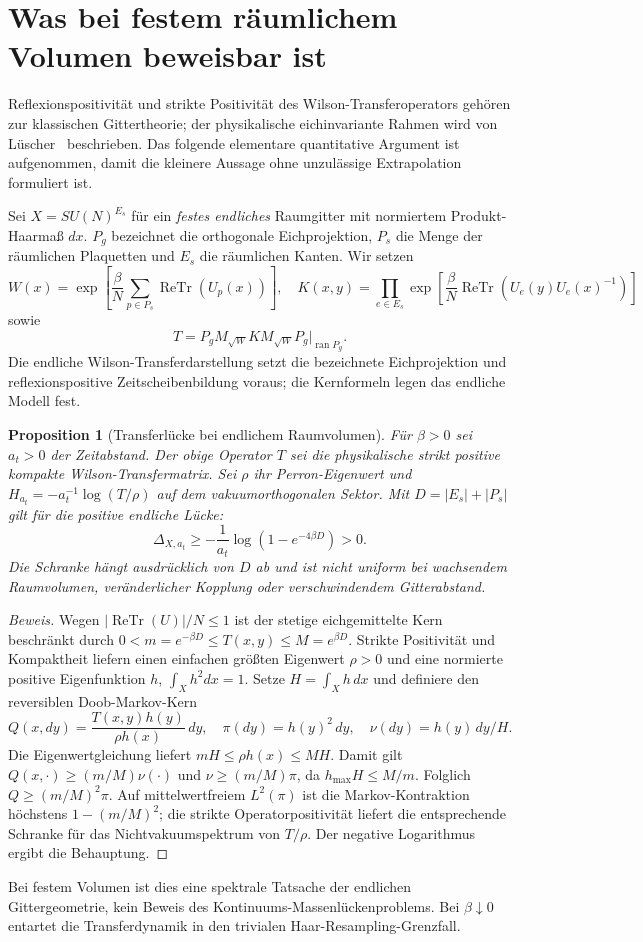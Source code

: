 \documentclass[11pt,a4paper]{article}
\newtheorem{proposition}[theorem]{Proposition}
\theoremstyle{remark}
\begin{document}
\section{Was bei festem räumlichem Volumen beweisbar ist}
Reflexionspositivität und strikte Positivität
des Wilson-Transferoperators gehören zur
klassischen Gittertheorie; der physikalische
eichinvariante Rahmen wird von
Lüscher~\cite{Luscher} beschrieben.
Das folgende elementare quantitative Argument
ist aufgenommen, damit die kleinere Aussage
ohne unzulässige Extrapolation formuliert ist.

Sei $X=SU(N)^{E_s}$ für ein \emph{festes endliches}
Raumgitter mit normiertem Produkt-Haarmaß $dx$.
$P_g$ bezeichnet die orthogonale Eichprojektion,
$P_s$ die Menge der räumlichen Plaquetten und
$E_s$ die räumlichen Kanten. Wir setzen
\[
W(x)=\exp\left[\frac\beta N\sum_{p\in P_s}
\operatorname{ReTr}(U_p(x))\right],
\quad
K(x,y)=\prod_{e\in E_s}
\exp\left[\frac\beta N\operatorname{ReTr}
(U_e(y)U_e(x)^{-1})\right]
\]
sowie
\[
T=P_g M_{\sqrt W}K M_{\sqrt W}P_g
       \big|_{\operatorname{ran}P_g}.
\]
Die endliche Wilson-Transferdarstellung setzt
die bezeichnete Eichprojektion und
reflexionspositive Zeitscheibenbildung voraus;
die Kernformeln legen das endliche Modell fest.

\begin{proposition}[Transferlücke bei endlichem Raumvolumen]\label{prop:finite}
Für $\beta>0$ sei $a_t>0$ der Zeitabstand.
Der obige Operator $T$ sei die physikalische
strikt positive kompakte Wilson-Transfermatrix.
Sei $\rho$ ihr Perron-Eigenwert und
$H_{a_t}=-a_t^{-1}\log(T/\rho)$ auf dem
vakuumorthogonalen Sektor.
Mit $D=|E_s|+|P_s|$ gilt für die
positive endliche Lücke:
\[
\boxed{\ \Delta_{X,a_t}\ge
-\frac{1}{a_t}\log\!\left(1-e^{-4\beta D}\right)>0.\ }
\]
Die Schranke hängt ausdrücklich von $D$ ab und
ist \emph{nicht} uniform bei wachsendem Raumvolumen,
veränderlicher Kopplung oder verschwindendem Gitterabstand.
\end{proposition}
\begin{proof}[Beweis]
Wegen $|\operatorname{ReTr}(U)|/N\le1$ ist der
stetige eichgemittelte Kern beschränkt durch
$0<m=e^{-\beta D}\le T(x,y)\le M=e^{\beta D}$.
Strikte Positivität und Kompaktheit liefern
einen einfachen größten Eigenwert $\rho>0$
und eine normierte positive Eigenfunktion $h$,
$\int_Xh^2dx=1$.
Setze $H=\int_Xh\,dx$ und definiere den
reversiblen Doob-Markov-Kern
\[
Q(x,dy)=\frac{T(x,y)h(y)}{\rho h(x)}\,dy,
\quad
\pi(dy)=h(y)^2\,dy,\quad
\nu(dy)=h(y)\,dy/H.
\]
Die Eigenwertgleichung liefert
$mH\le\rho h(x)\le MH$.
Damit gilt
$Q(x,\cdot)\ge(m/M)\nu(\cdot)$ und
$\nu\ge(m/M)\pi$, da $h_{\max}H\le M/m$.
Folglich $Q\ge(m/M)^2\pi$.
Auf mittelwertfreiem $L^2(\pi)$ ist die
Markov-Kontraktion höchstens
$1-(m/M)^2$; die strikte Operatorpositivität
liefert die entsprechende Schranke für
das Nichtvakuumspektrum von $T/\rho$.
Der negative Logarithmus ergibt die Behauptung.
\end{proof}
Bei festem Volumen ist dies eine spektrale
Tatsache der endlichen Gittergeometrie,
kein Beweis des Kontinuums-Massenlückenproblems.
Bei $\beta\downarrow0$ entartet die
Transferdynamik in den trivialen
Haar-Resampling-Grenzfall.
\end{document}
